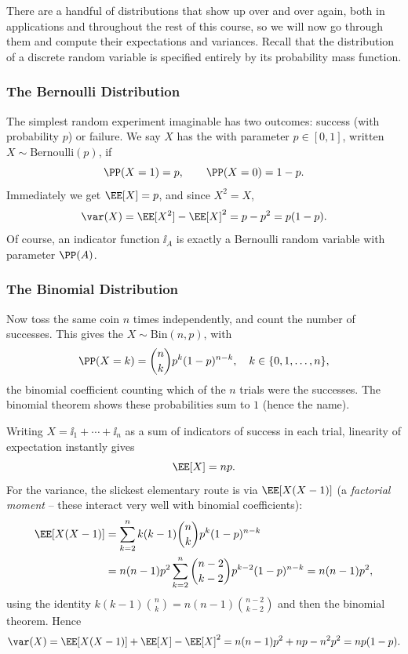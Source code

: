 There are a handful of distributions that show up over and over again, both in applications and throughout the rest of this course, so we will now go through them and compute their expectations and variances. Recall that the distribution of a discrete random variable is specified entirely by its probability mass function.

\subsubsection*{The Bernoulli Distribution}

The simplest random experiment imaginable has two outcomes: success (with probability $p$) or failure. We say $X$ has the  with parameter $p \in [0, 1]$, written $X \sim \mathrm{Bernoulli}(p)$, if
$$
\PP(X = 1) = p, \qquad \PP(X = 0) = 1 - p.
$$
Immediately we get $\EE[X] = p$, and since $X^2 = X$,
$$
\var(X) = \EE[X^2] - \EE[X]^2 = p - p^2 = p(1-p).
$$
Of course, an indicator function $\ii_A$ is exactly a Bernoulli random variable with parameter $\PP(A)$.

\subsubsection*{The Binomial Distribution}

Now toss the same coin $n$ times independently, and count the number of successes. This gives the  $X \sim \mathrm{Bin}(n, p)$, with
$$
\PP(X = k) = \binom{n}{k} p^k (1 - p)^{n - k}, \quad k \in \{0, 1, \dots, n\},
$$
the binomial coefficient counting which of the $n$ trials were the successes. The binomial theorem shows these probabilities sum to $1$ (hence the name).

Writing $X = \ii_1 + \cdots + \ii_n$ as a sum of indicators of success in each trial, linearity of expectation instantly gives
$$
\EE[X] = np.
$$
For the variance, the slickest elementary route is via $\EE[X(X-1)]$ (a \emph{factorial moment} -- these interact very well with binomial coefficients):
\begin{align*}
	\EE[X(X - 1)] &= \sum_{k = 2}^{n} k(k-1)\binom{n}{k}p^k (1-p)^{n - k} \\
	&= n(n-1)p^2 \sum_{k = 2}^{n} \binom{n - 2}{k - 2} p^{k - 2}(1 - p)^{n - k} = n(n - 1)p^2,
\end{align*}
using the identity $k(k-1)\binom{n}{k} = n(n-1)\binom{n-2}{k-2}$ and then the binomial theorem. Hence
$$
\var(X) = \EE[X(X-1)] + \EE[X] - \EE[X]^2 = n(n-1)p^2 + np - n^2p^2 = np(1 - p).
$$

